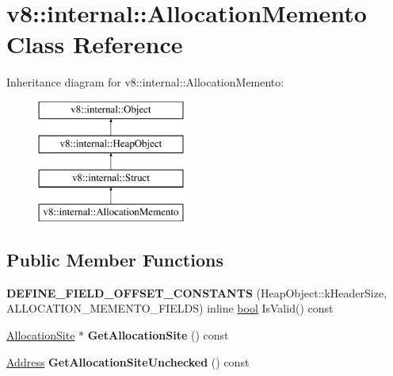 \hypertarget{classv8_1_1internal_1_1AllocationMemento}{}\section{v8\+:\+:internal\+:\+:Allocation\+Memento Class Reference}
\label{classv8_1_1internal_1_1AllocationMemento}
Inheritance diagram for v8\+:\+:internal\+:\+:Allocation\+Memento\+:\begin{figure}[H]
\begin{center}
\leavevmode
\includegraphics[height=4.000000cm]{classv8_1_1internal_1_1AllocationMemento}
\end{center}
\end{figure}
\subsection*{Public Member Functions}
\begin{DoxyCompactItemize}
\item 
\mbox{\label{classv8_1_1internal_1_1AllocationMemento_ae5c6d7844d9d36941b4a216d388ccfa2}} 
{\bfseries D\+E\+F\+I\+N\+E\+\_\+\+F\+I\+E\+L\+D\+\_\+\+O\+F\+F\+S\+E\+T\+\_\+\+C\+O\+N\+S\+T\+A\+N\+TS} (Heap\+Object\+::k\+Header\+Size, A\+L\+L\+O\+C\+A\+T\+I\+O\+N\+\_\+\+M\+E\+M\+E\+N\+T\+O\+\_\+\+F\+I\+E\+L\+DS) inline \mbox{\hyperlink{classbool}{bool}} Is\+Valid() const
\item 
\mbox{\label{classv8_1_1internal_1_1AllocationMemento_af20ff245d696488e5658825da910f25e}} 
\mbox{\hyperlink{classv8_1_1internal_1_1AllocationSite}{Allocation\+Site}} $\ast$ {\bfseries Get\+Allocation\+Site} () const
\item 
\mbox{\label{classv8_1_1internal_1_1AllocationMemento_ad38a84caef4b9046b2d0ebf7146ed5cf}} 
\mbox{\hyperlink{classuintptr__t}{Address}} {\bfseries Get\+Allocation\+Site\+Unchecked} () const
\end{DoxyCompactItemize}
